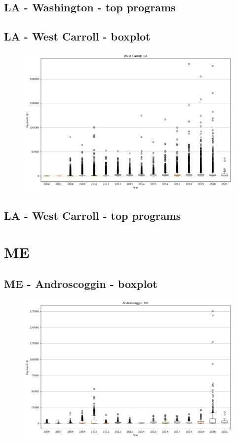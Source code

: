 \subsection*{LA - Washington - top programs}

\newpage
\subsection*{LA - West Carroll - boxplot}
\begin{figure}[h]
\centering
\includegraphics[width=7in]{../output/boxplots/counties/West Carroll-LA_boxplot.png}
\end{figure}


\subsection*{LA - West Carroll - top programs}

\newpage
\section*{ME}
\subsection*{ME - Androscoggin - boxplot}
\begin{figure}[h]
\centering
\includegraphics[width=7in]{../output/boxplots/counties/Androscoggin-ME_boxplot.png}
\end{figure}


